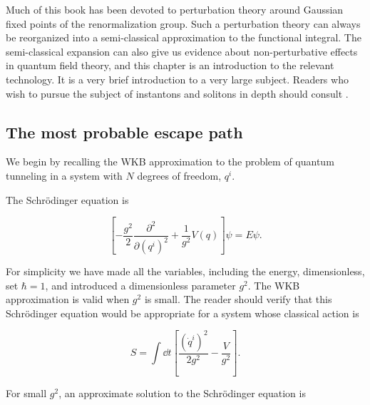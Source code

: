 
Much of this book has been devoted to perturbation theory around Gaussian fixed
points of the renormalization group. Such a perturbation theory can always be
reorganized into a semi-classical approximation to the functional integral. The
semi-classical expansion can also give us evidence about non-perturbative effects
in quantum field theory, and this chapter is an introduction to the relevant
technology. It is a very brief introduction to a very large subject. Readers who
wish to pursue the subject of instantons and solitons in depth should consult
\cite{banks-ref-135,banks-ref-136,banks-ref-137,banks-ref-138}.

\subsection{The most probable escape path}

We begin by recalling the WKB approximation to the problem of quantum tunneling
in a system with $N$ degrees of freedom, $q^i$.

The Schrödinger equation is

\begin{equation}
  \left[-\frac{g^2}{2}\frac{\partial^2}{\partial(q^i)^2}
    +\frac{1}{g^2}V(q)\right]\psi=E\psi.
  \label{eq:10.1}
\end{equation}

For simplicity we have made all the variables, including the energy,
dimensionless, set $\hbar=1$, and introduced a dimensionless parameter $g^2$.
The WKB approximation is valid when $g^2$ is small. The reader should verify
that this Schrödinger equation would be appropriate for a system whose classical
action is

\begin{equation}
  S=\int\!\dd t\left[\frac{(\dot q^i)^2}{2g^2}-\frac{V}{g^2}\right].
  \label{eq:10.2}
\end{equation}

For small $g^2$, an approximate solution to the Schrödinger equation is

